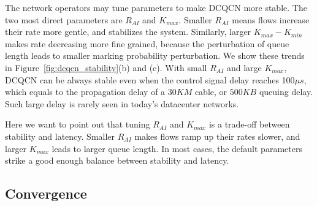 The network operators may tune parameters to make DCQCN more stable. The two most direct parameters are $R_{AI}$ and $K_{max}$.
Smaller $R_{AI}$ means flows increase their rate more gentle, and stabilizes the system. Similarly, larger $K_{max} - K_{min}$
makes rate decreasing more fine grained, because the perturbation of queue length leads to smaller marking probability 
perturbation. We show these trends in Figure~\ref{fig:dcqcn_stability}(b) and (c). With small $R_{AI}$ and large $K_{max}$,
DCQCN can be always stable even when the control signal delay reaches 100$\mu s$, which equals to the propagation delay of a 
$30KM$ cable, or $500KB$ queuing delay. Such large delay is rarely seen in today's datacenter networks.

Here we want to point out that tuning $R_{AI}$ and $K_{max}$ is a trade-off between stability and latency. Smaller $R_{AI}$
makes flows ramp up their rates slower, and larger $K_{max}$ leads to larger queue length. In most cases, the default parameters
strike a good enough balance between stability and latency.

\subsection{Convergence}
